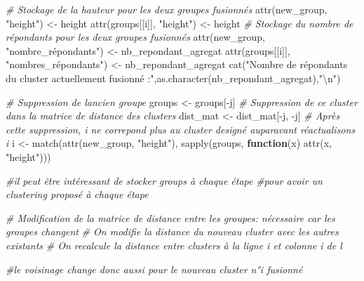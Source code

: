 \documentclass[
]{article}
\newenvironment{Shaded}{\begin{snugshade}}{\end{snugshade}}
\newcommand{\CommentTok}[1]{\textcolor[rgb]{0.56,0.35,0.01}{\textit{#1}}}
\newcommand{\ControlFlowTok}[1]{\textcolor[rgb]{0.13,0.29,0.53}{\textbf{#1}}}
\newcommand{\FunctionTok}[1]{\textcolor[rgb]{0.00,0.00,0.00}{#1}}
\newcommand{\NormalTok}[1]{#1}
\newcommand{\OtherTok}[1]{\textcolor[rgb]{0.56,0.35,0.01}{#1}}
\newcommand{\SpecialCharTok}[1]{\textcolor[rgb]{0.00,0.00,0.00}{#1}}
\newcommand{\StringTok}[1]{\textcolor[rgb]{0.31,0.60,0.02}{#1}}
\begin{document}
\begin{Shaded}
\begin{Highlighting}[]
      \CommentTok{\# Stockage de la hauteur pour les deux groupes fusionnés}
      \FunctionTok{attr}\NormalTok{(new\_group, }\StringTok{"height"}\NormalTok{) }\OtherTok{\textless{}{-}}\NormalTok{ height}
      \FunctionTok{attr}\NormalTok{(groups[[i]], }\StringTok{"height"}\NormalTok{) }\OtherTok{\textless{}{-}}\NormalTok{ height}
      \CommentTok{\# Stockage du nombre de répondants pour les deux groupes fusionnés}
      \FunctionTok{attr}\NormalTok{(new\_group, }\StringTok{"nombre\_répondants"}\NormalTok{) }\OtherTok{\textless{}{-}}\NormalTok{ nb\_repondant\_agregat}
      \FunctionTok{attr}\NormalTok{(groups[[i]], }\StringTok{"nombres\_répondants"}\NormalTok{) }\OtherTok{\textless{}{-}}\NormalTok{ nb\_repondant\_agregat}
      \FunctionTok{cat}\NormalTok{(}\StringTok{"Nombre de répondants du cluster actuellement fusionné :"}\NormalTok{,}\FunctionTok{as.character}\NormalTok{(nb\_repondant\_agregat),}\StringTok{"}\SpecialCharTok{\textbackslash{}n}\StringTok{"}\NormalTok{)}
      
      \CommentTok{\# Suppression de l\textquotesingle{}ancien groupe}
\NormalTok{      groups }\OtherTok{\textless{}{-}}\NormalTok{ groups[}\SpecialCharTok{{-}}\NormalTok{j]}
      \CommentTok{\# Suppression de ce cluster dans la matrice de distance des clusters}
\NormalTok{      dist\_mat }\OtherTok{\textless{}{-}}\NormalTok{ dist\_mat[}\SpecialCharTok{{-}}\NormalTok{j, }\SpecialCharTok{{-}}\NormalTok{j]}
      \CommentTok{\# Après cette suppression, i ne correpond plus au cluster designé auparavant réactualisons i}
\NormalTok{      i }\OtherTok{\textless{}{-}} \FunctionTok{match}\NormalTok{(}\FunctionTok{attr}\NormalTok{(new\_group, }\StringTok{"height"}\NormalTok{), }\FunctionTok{sapply}\NormalTok{(groups, }\ControlFlowTok{function}\NormalTok{(x) }\FunctionTok{attr}\NormalTok{(x, }\StringTok{"height"}\NormalTok{)))}
      
      \CommentTok{\#il peut être intéressant de stocker groups  à chaque étape}
      \CommentTok{\#pour avoir un clustering proposé à chaque étape}
      
      \CommentTok{\# Modification de la matrice de distance entre les groupes: nécessaire car les groupes changent }
      \CommentTok{\# On modifie la distance du nouveau cluster avec les autres existants}
      \CommentTok{\# On recalcule la distance entre clusters à la ligne i et colonne i de l}
      
      \CommentTok{\#le voisinage change donc aussi pour le nouveau cluster n°i fusionné}
      

\end{Highlighting}
\end{Shaded}
\end{document}
